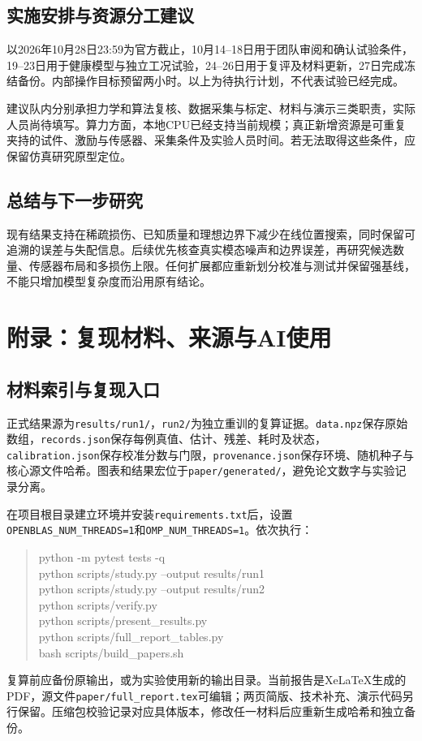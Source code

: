 \documentclass[UTF8,a4paper,11pt,fontset=fandol]{ctexart}
\begin{document}
\subsection{实施安排与资源分工建议}
以2026年10月28日23:59为官方截止，10月14--18日用于团队审阅和确认试验条件，19--23日用于健康模型与独立工况试验，24--26日用于复评及材料更新，27日完成冻结备份。内部操作目标预留两小时。以上为待执行计划，不代表试验已经完成。

建议队内分别承担力学和算法复核、数据采集与标定、材料与演示三类职责，实际人员尚待填写。算力方面，本地CPU已经支持当前规模；真正新增资源是可重复夹持的试件、激励与传感器、采集条件及实验人员时间。若无法取得这些条件，应保留仿真研究原型定位。
\subsection{总结与下一步研究}
现有结果支持在稀疏损伤、已知质量和理想边界下减少在线位置搜索，同时保留可追溯的误差与失配信息。后续优先核查真实模态噪声和边界误差，再研究候选数量、传感器布局和多损伤上限。任何扩展都应重新划分校准与测试并保留强基线，不能只增加模型复杂度而沿用原有结论。

\newpage
\section{附录：复现材料、来源与AI使用}
\subsection{材料索引与复现入口}
正式结果源为\texttt{results/run1/}，\texttt{run2/}为独立重训的复算证据。\texttt{data.npz}保存原始数组，\texttt{records.json}保存每例真值、估计、残差、耗时及状态，\texttt{calibration.json}保存校准分数与门限，\texttt{provenance.json}保存环境、随机种子与核心源文件哈希。图表和结果宏位于\texttt{paper/generated/}，避免论文数字与实验记录分离。

在项目根目录建立环境并安装\texttt{requirements.txt}后，设置\texttt{OPENBLAS\_NUM\_THREADS=1}和\texttt{OMP\_NUM\_THREADS=1}。依次执行：
\begin{quote}\small\ttfamily
python -m pytest tests -q\\
python scripts/study.py --output results/run1\\
python scripts/study.py --output results/run2\\
python scripts/verify.py\\
python scripts/present\_results.py\\
python scripts/full\_report\_tables.py\\
bash scripts/build\_papers.sh
\end{quote}
复算前应备份原输出，或为实验使用新的输出目录。当前报告是XeLaTeX生成的PDF，源文件\texttt{paper/full\_report.tex}可编辑；两页简版、技术补充、演示代码另行保留。压缩包校验记录对应具体版本，修改任一材料后应重新生成哈希和独立备份。
\end{document}
